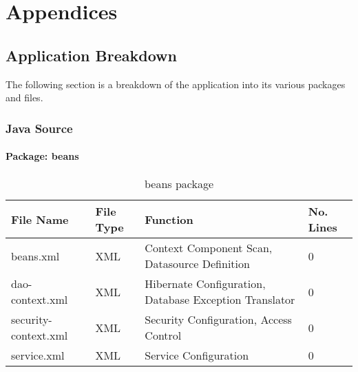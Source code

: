 \chapter{Appendices}
\label{appendices}

\section{Application Breakdown}

The following section is a breakdown of the application into its various packages and files.
\subsection{Java Source}
\subsubsection{Package: beans}
\begin{table}[H]
\begin{center}
    \begin{tabular}{| l | l | l| p{1cm} |}
    \hline
    File Name & File Type & Function & No. Lines\\ \hline
    beans.xml & XML & Context Component Scan, Datasource Definition & 0 \\ \hline
	dao-context.xml & XML & Hibernate Configuration, Database Exception Translator & 0 \\ \hline
	security-context.xml & XML & Security Configuration, Access Control & 0 \\ \hline
	service.xml & XML & Service Configuration & 0 \\ \hline
    \end{tabular}
\end{center}
\caption{beans package}
\end{table}


